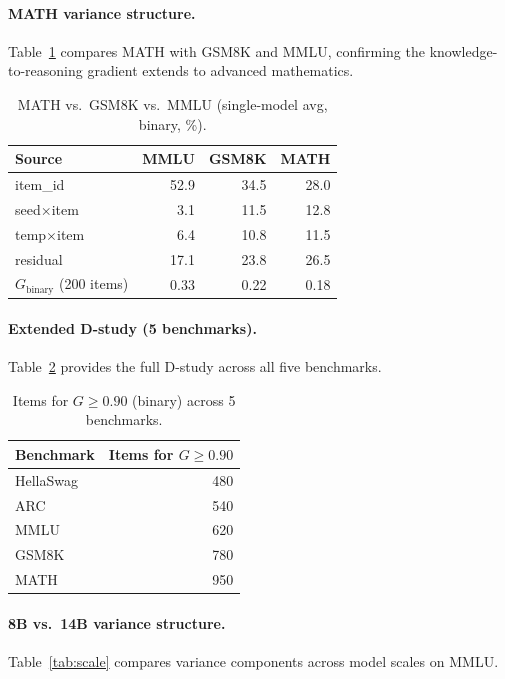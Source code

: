 \documentclass[letterpaper,11pt]{article}
\begin{document}
\paragraph{MATH variance structure.}
Table~\ref{tab:math_compare} compares MATH with GSM8K and MMLU, confirming the knowledge-to-reasoning gradient extends to advanced mathematics.

\begin{table}[h]
\centering
\caption{MATH vs.\ GSM8K vs.\ MMLU (single-model avg, binary, \%).}
\label{tab:math_compare}
\small
\begin{tabular}{@{}l rrr@{}}
\toprule
Source & MMLU & GSM8K & MATH \\
\midrule
item\_id        & 52.9 & 34.5 & 28.0 \\
seed$\times$item    &  3.1 & 11.5 & 12.8 \\
temp$\times$item    &  6.4 & 10.8 & 11.5 \\
residual        & 17.1 & 23.8 & 26.5 \\
$G_\text{binary}$ (200 items) & 0.33 & 0.22 & 0.18 \\
\bottomrule
\end{tabular}
\end{table}

\paragraph{Extended D-study (5 benchmarks).}
Table~\ref{tab:dstudy_ext} provides the full D-study across all five benchmarks.

\begin{table}[h]
\centering
\caption{Items for $G\geq0.90$ (binary) across 5 benchmarks.}
\label{tab:dstudy_ext}
\small
\begin{tabular}{@{}l r@{}}
\toprule
Benchmark & Items for $G\geq0.90$ \\
\midrule
HellaSwag & 480 \\
ARC       & 540 \\
MMLU      & 620 \\
GSM8K     & 780 \\
MATH      & 950 \\
\bottomrule
\end{tabular}
\end{table}

\paragraph{8B vs.\ 14B variance structure.}
Table~\ref{tab:scale} compares variance components across model scales on MMLU.
\end{document}
